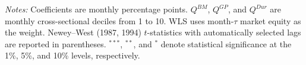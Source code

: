 \begin{table}[!htbp]
    \vspace{0.5em}
    \begin{minipage}{0.98\textwidth}
    \footnotesize
    \textit{Notes:} Coefficients are monthly percentage points. $Q^{BM}$, $Q^{GP}$, and $Q^{Dur}$ are monthly cross-sectional deciles from 1 to 10. WLS uses month-$\tau$ market equity as the weight. Newey--West (1987, 1994) $t$-statistics with automatically selected lags are reported in parentheses. $^{***}$, $^{**}$, and $^{*}$ denote statistical significance at the 1\%, 5\%, and 10\% levels, respectively.
    \end{minipage}
\end{table}
\FloatBarrier
